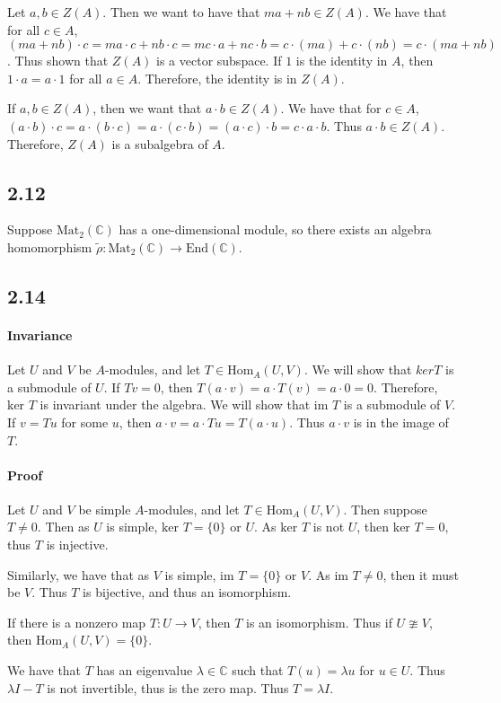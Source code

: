 \documentclass[]{article}
\begin{document}
Let $a, b \in Z(A)$. Then we want to have that $ma + nb \in Z(A)$. We have that for all $c \in A$, $(ma + nb) \cdot c = ma \cdot c + nb \cdot c = m c \cdot a + n c \cdot b = c \cdot (ma) + c \cdot (nb) = c \cdot (ma + nb)$. Thus shown that $Z(A)$ is a vector subspace.
If $1$ is the identity in $A$, then $1 \cdot a = a \cdot 1$ for all $a \in A$. Therefore, the identity is in $Z(A)$.

If $a, b \in Z(A)$, then we want that $a \cdot b \in Z(A)$. We have that for $c \in A$, $(a \cdot b) \cdot c = a \cdot ( b \cdot c) = a \cdot (c \cdot b) = (a \cdot c) \cdot b = c \cdot a \cdot b$. Thus $a \cdot b \in Z(A)$. 
Therefore, $Z(A)$ is a subalgebra of $A$. 

\subsection*{2.12}
Suppose $\text{Mat}_2(\mathbb{C})$ has a one-dimensional module, so there exists an algebra homomorphism $\tilde{\rho} : \text{Mat}_2(\mathbb{C}) \rightarrow \text{End}(\mathbb{C})$. 
\subsection*{2.14}
\paragraph{Invariance}
Let $U$ and $V$ be $A$-modules, and let $T \in \text{Hom}_A(U, V)$. 
We will show that $ker T$ is a submodule of $U$.
If $Tv = 0$, then $T (a \cdot v) = a \cdot T(v) = a \cdot 0 = 0$. Therefore, $\text{ker } T$ is invariant under the algebra.
We will show that $\text{im } T$ is a submodule of $V$.
If $v = T u$ for some $u$, then $a \cdot v = a \cdot Tu = T (a \cdot u)$. Thus $a \cdot v$ is in the image of $T$.
\paragraph{Proof} 
Let $U$ and $V$ be simple $A$-modules, and let $T \in \text{Hom}_A(U, V)$. 
Then suppose $T \neq 0$. Then as $U$ is simple, $\text{ker } T = \lbrace 0 \rbrace$ or $U$. As $\text{ker } T$ is not $U$, then $\text{ker } T = 0$, thus $T$ is injective.

Similarly, we have that as $V$ is simple, $\text{im } T = \lbrace 0 \rbrace$ or $V$. As $\text{im } T \neq 0$, then it must be $V$. Thus $T$ is bijective, and thus an isomorphism.
\par
If there is a nonzero map $T : U \rightarrow V$, then $T$ is an isomorphism. Thus if $U \ncong V$, then $\text{Hom}_A(U, V) = \lbrace 0 \rbrace$.

\par
We have that $T$ has an eigenvalue $\lambda \in \mathbb{C}$ such that $T(u) = \lambda u$ for $u \in U$. Thus $\lambda I - T$ is not invertible, thus is the zero map. Thus $T = \lambda I$. 
\end{document}

